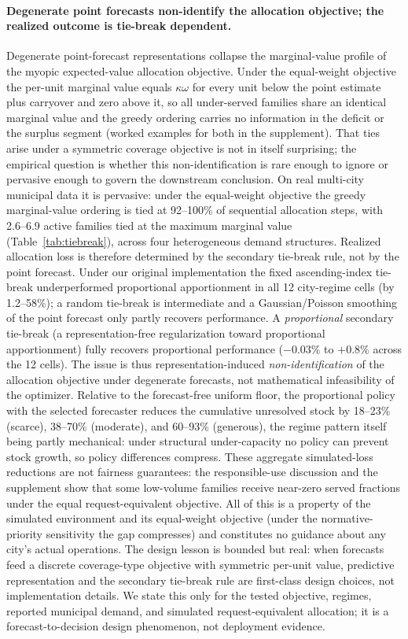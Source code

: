 \paragraph{Degenerate point forecasts non-identify the allocation
objective; the realized outcome is tie-break dependent.}
Degenerate point-forecast representations collapse the marginal-value
profile of the myopic expected-value allocation objective. Under the
equal-weight objective the per-unit marginal value equals $\kappa\omega$ for
every unit below the point estimate plus carryover and zero above it, so
all under-served families share an identical marginal value and the
greedy ordering carries no information in the deficit or the surplus
segment (worked examples for both in the supplement). That ties arise
under a symmetric coverage objective is not
in itself surprising; the empirical question is whether this
non-identification is rare enough to ignore or pervasive enough to govern
the downstream conclusion. On real multi-city municipal data it is
pervasive: under the equal-weight objective the greedy marginal-value
ordering is tied at 92--100\% of sequential allocation steps, with
2.6--6.9 active families tied at the maximum marginal value
(Table~\ref{tab:tiebreak}), across four heterogeneous demand
structures. Realized allocation loss is therefore determined by the
secondary tie-break rule, not by the point forecast.
Under our original implementation the fixed ascending-index tie-break
underperformed proportional apportionment in all 12 city-regime cells
(by 1.2--58\%); a random tie-break is intermediate and a
Gaussian/Poisson smoothing of the point forecast only partly recovers
performance. A \emph{proportional} secondary tie-break (a
representation-free regularization toward proportional apportionment)
fully recovers proportional performance ($-0.03\%$ to $+0.8\%$ across the
12 cells). The issue is thus representation-induced \emph{non-identification}
of the allocation objective under degenerate forecasts, not mathematical
infeasibility of the optimizer. Relative to the forecast-free uniform
floor, the proportional policy with the selected forecaster reduces the
cumulative unresolved stock by 18--23\% (scarce), 38--70\% (moderate),
and 60--93\% (generous), the regime pattern itself being partly
mechanical: under structural under-capacity no policy can prevent stock
growth, so policy differences compress. These aggregate simulated-loss
reductions are not fairness guarantees: the responsible-use discussion and
the supplement show that some low-volume families receive near-zero served
fractions under the equal request-equivalent objective. All of this is a
property of the simulated environment and its equal-weight objective
(under the normative-priority sensitivity the gap compresses) and
constitutes no guidance about any city's actual operations. The design
lesson is bounded but real: when forecasts feed a discrete coverage-type
objective with symmetric per-unit value, predictive representation and the
secondary tie-break rule are first-class design choices, not implementation
details. We state this only for the tested objective, regimes, reported
municipal demand, and simulated request-equivalent allocation; it is a
forecast-to-decision design phenomenon, not deployment evidence.

